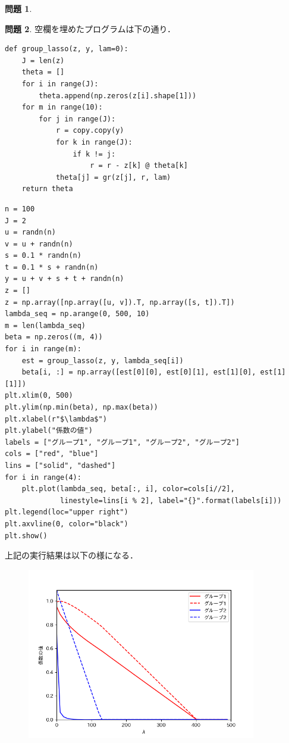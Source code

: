 \documentclass[titlepage]{jsarticle}
\theoremstyle{definition}
\newtheorem{Ex}{問題}
\theoremstyle{mystyle} %
\renewcommand{\footnotesize}{\normalsize}
\begin{document}
\begin{Ex}

\end{Ex}
\begin{Ex}
  空欄を埋めたプログラムは下の通り．
  \begin{lstlisting}[basicstyle = \ttfamily\footnotesize, frame = single]
def group_lasso(z, y, lam=0):
    J = len(z)
    theta = []
    for i in range(J):
        theta.append(np.zeros(z[i].shape[1]))
    for m in range(10):
        for j in range(J):
            r = copy.copy(y)
            for k in range(J):
                if k != j:
                    r = r - z[k] @ theta[k]
            theta[j] = gr(z[j], r, lam)
    return theta
  \end{lstlisting}

  \begin{lstlisting}[basicstyle = \ttfamily\footnotesize, frame = single]
n = 100
J = 2
u = randn(n)
v = u + randn(n)
s = 0.1 * randn(n)
t = 0.1 * s + randn(n)
y = u + v + s + t + randn(n)
z = []
z = np.array([np.array([u, v]).T, np.array([s, t]).T])
lambda_seq = np.arange(0, 500, 10)
m = len(lambda_seq)
beta = np.zeros((m, 4))
for i in range(m):
    est = group_lasso(z, y, lambda_seq[i])
    beta[i, :] = np.array([est[0][0], est[0][1], est[1][0], est[1][1]])
plt.xlim(0, 500)
plt.ylim(np.min(beta), np.max(beta))
plt.xlabel(r"$\lambda$")
plt.ylabel("係数の値")
labels = ["グループ1", "グループ1", "グループ2", "グループ2"]
cols = ["red", "blue"]
lins = ["solid", "dashed"]
for i in range(4):
    plt.plot(lambda_seq, beta[:, i], color=cols[i//2],
             linestyle=lins[i % 2], label="{}".format(labels[i]))
plt.legend(loc="upper right")
plt.axvline(0, color="black")
plt.show()
    \end{lstlisting}
上記の実行結果は以下の様になる．
\begin{figure}[H]
\includegraphics[width=10cm]{gr.png}
\end{figure}
\end{Ex}
\end{document}
